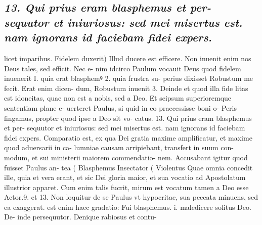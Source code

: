 \documentclass{article}
\begin{document}
\begin{pages}
\subsection*{\textit{13. Qui prius eram blasphemus et per- sequutor et iniuriosus: sed mei misertus est. nam ignorans id faciebam fidei expers.}}licet imparibus. Fidelem duxerit) Illud ducere est efficere. Non inuenit enim nos Deus tales, sed efficit. Nec e- nim idcirco Paulum vocauit Deus quod fidelem inuenerit I. quia erat blasphemꝰ 2. quia frustra su- perius dixisset Robustum me fecit. Erat enim dicen- dum, Robustum inuenit 3. Deinde et quod illa fide litas est idoneitas, quae non est a nobis, sed a Deo. Et seipsum superioremque sententiam plane e- uerteret Paulus, si quid in eo praecessisse boni o- Peris fingamus, propter quod ipse a Deo sit vo- catus. 13. Qui prius eram blasphemus et per- sequutor et iniuriosus: sed mei misertus est. nam ignorans id faciebam fidei expers. Comparatio est, ex qua Dei gratia maxime amplificatur, et maxime quod aduersarii in ca- lumniae causam arripiebant, transfert in suum con- modum, et sui ministerii maiorem commendatio- nem. Accusabant igitur quod fuisset Paulus an- tea ( Blasphemus Insectator ( Violentus Quae omnia concedit ille, quia et vera erant, et sic Dei gloria maior, et sua vocatio ad Apostolatum illustrior apparet. Cum enim talis fucrit, mirum est vocatum tamen a Deo esse Actor.9. et 13. Non loquitur de se Paulus vt hypocritae, sua peccata minuens, sed ea exaggerat. est enim haec gradatio: Fui blasphemus. i. maledicere solitus Deo. De- inde persequutor. Denique rabiosus et contu-  \pend

\end{pages}
\end{document}
